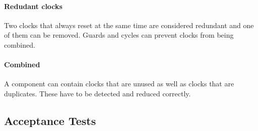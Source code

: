 \paragraph{Redudant clocks}
Two clocks that always reset at the same time are considered redundant and one of them can be removed. Guards and cycles can prevent clocks from being combined.

\paragraph{Combined}
A component can contain clocks that are unused as well as clocks that are duplicates. These have to be detected and reduced correctly.


\subsection{Acceptance Tests}



